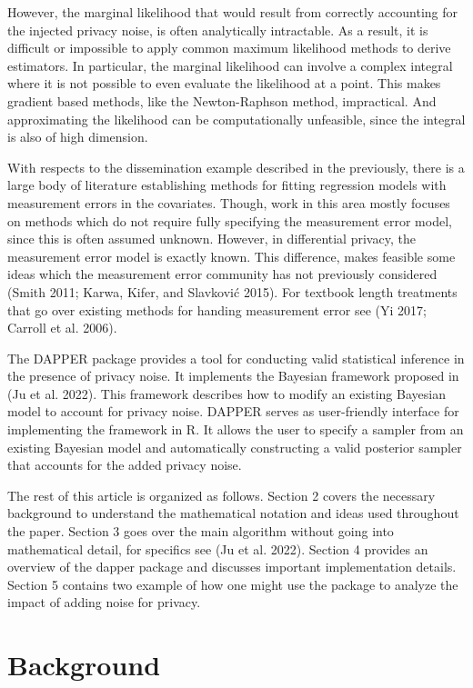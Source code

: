 However, the marginal likelihood that would result from correctly accounting for the injected
privacy noise, is often analytically intractable. As a result,
it is difficult or impossible to apply common maximum likelihood methods
to derive estimators. In particular, the marginal likelihood can involve a complex
integral where it is not possible to even evaluate the likelihood
at a point. This makes gradient based methods, like the Newton-Raphson method,
impractical. And approximating the likelihood can be computationally
unfeasible, since the integral is also of high dimension.

With respects to the dissemination example
described in the previously, there is a large body of literature
establishing methods for fitting regression models with measurement errors
in the covariates. Though, work in this area mostly focuses on methods which do not require fully specifying the
measurement error model, since this is often assumed unknown.
However, in differential privacy, the measurement error model is exactly known.
This difference, makes feasible some ideas which the measurement
error community has not previously considered (Smith 2011; Karwa, Kifer, and Slavković 2015).
For textbook length treatments that go over existing methods for handing measurement
error see (Yi 2017; Carroll et al. 2006).

The DAPPER package provides a tool for conducting
valid statistical inference in the presence of privacy noise.
It implements the Bayesian framework proposed in (Ju et al. 2022). This framework describes how to modify
an existing Bayesian model to account for privacy noise. DAPPER
serves as user-friendly interface for implementing the framework in R. It allows the
user to specify a sampler from an existing Bayesian model and
automatically constructing a valid posterior sampler that accounts for the
added privacy noise.

The rest of this article is organized as follows. Section 2 covers the necessary background to understand the mathematical notation
and ideas used throughout the paper. Section 3 goes over the main algorithm without
going into mathematical detail, for specifics see (Ju et al. 2022). Section 4 provides
an overview of the dapper package and discusses important implementation details.
Section 5 contains two example of how one might use the package to analyze the
impact of adding noise for privacy.

\hypertarget{background}{%
\section{Background}\label{background}}


